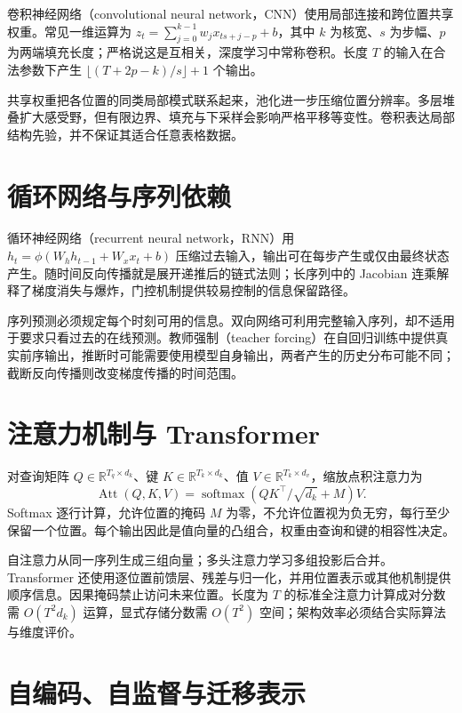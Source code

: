 \documentclass[UTF8,12pt,a4paper,fontset=fandol]{ctexbook}
\begin{document}
卷积神经网络（convolutional neural network，CNN）使用局部连接和跨位置共享权重。常见一维运算为 $z_t=\sum_{j=0}^{k-1}w_jx_{ts+j-p}+b$，其中 $k$ 为核宽、$s$ 为步幅、$p$ 为两端填充长度；严格说这是互相关，深度学习中常称卷积。长度 $T$ 的输入在合法参数下产生 $\lfloor(T+2p-k)/s\rfloor+1$ 个输出。

共享权重把各位置的同类局部模式联系起来，池化进一步压缩位置分辨率。多层堆叠扩大感受野，但有限边界、填充与下采样会影响严格平移等变性。卷积表达局部结构先验，并不保证其适合任意表格数据。

\section{循环网络与序列依赖}

循环神经网络（recurrent neural network，RNN）用 $h_t=\phi(W_hh_{t-1}+W_xx_t+b)$ 压缩过去输入，输出可在每步产生或仅由最终状态产生。随时间反向传播就是展开递推后的链式法则；长序列中的 Jacobian 连乘解释了梯度消失与爆炸，门控机制提供较易控制的信息保留路径。

序列预测必须规定每个时刻可用的信息。双向网络可利用完整输入序列，却不适用于要求只看过去的在线预测。教师强制（teacher forcing）在自回归训练中提供真实前序输出，推断时可能需要使用模型自身输出，两者产生的历史分布可能不同；截断反向传播则改变梯度传播的时间范围。

\section{注意力机制与 Transformer}

对查询矩阵 $Q\in\mathbb R^{T_q\times d_k}$、键 $K\in\mathbb R^{T_k\times d_k}$、值 $V\in\mathbb R^{T_k\times d_v}$，缩放点积注意力为
\begin{equation}
 \operatorname{Att}(Q,K,V)=
 \operatorname{softmax}(QK^\top/\sqrt{d_k}+M)V.
 \label{eq:ml-attention}
\end{equation}
Softmax 逐行计算，允许位置的掩码 $M$ 为零，不允许位置视为负无穷，每行至少保留一个位置。每个输出因此是值向量的凸组合，权重由查询和键的相容性决定。

自注意力从同一序列生成三组向量；多头注意力学习多组投影后合并。Transformer 还使用逐位置前馈层、残差与归一化，并用位置表示或其他机制提供顺序信息。因果掩码禁止访问未来位置。长度为 $T$ 的标准全注意力计算成对分数需 $O(T^2d_k)$ 运算，显式存储分数需 $O(T^2)$ 空间；架构效率必须结合实际算法与维度评价。

\section{自编码、自监督与迁移表示}
\end{document}
